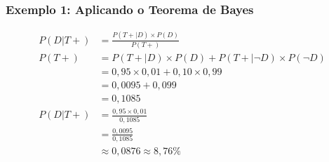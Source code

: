 \documentclass[11pt]{beamer}
\begin{document}
\begin{frame}
\frametitle{Exemplo 1: Aplicando o Teorema de Bayes}
\begin{align*}
P(D|T+) &= \frac{P(T+|D) \times P(D)}{P(T+)} \\[10pt]
P(T+) &= P(T+|D) \times P(D) + P(T+|\neg D) \times P(\neg D) \\
&= 0,95 \times 0,01 + 0,10 \times 0,99 \\
&= 0,0095 + 0,099 \\
&= 0,1085 \\[10pt]
P(D|T+) &= \frac{0,95 \times 0,01}{0,1085} \\
&= \frac{0,0095}{0,1085} \\
&\approx 0,0876 \approx 8,76\%
\end{align*}
\end{frame}
\end{document}
